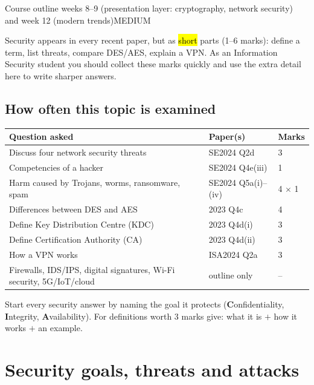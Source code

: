 \documentclass[10pt]{article}
\begin{document}
  {Course outline weeks 8--9 (presentation layer: cryptography, network security) and week 12 (modern trends)}{MEDIUM}

Security appears in every recent paper, but as \hl{short} parts (1--6 marks): define a term, list threats, compare DES/AES, explain a VPN.
As an Information Security student you should collect these marks quickly and use the extra detail here to write sharper answers.

\subsection*{How often this topic is examined}
\begin{tabularx}{\linewidth}{@{}Xll@{}}
\toprule
\textbf{Question asked} & \textbf{Paper(s)} & \textbf{Marks}\\
\midrule
Discuss four network security threats & SE2024 Q2d & 3\\
Competencies of a hacker & SE2024 Q4e(iii) & 1\\
Harm caused by Trojans, worms, ransomware, spam & SE2024 Q5a(i)--(iv) & 4 $\times$ 1\\
Differences between DES and AES & 2023 Q4c & 4\\
Define Key Distribution Centre (KDC) & 2023 Q4d(i) & 3\\
Define Certification Authority (CA) & 2023 Q4d(ii) & 3\\
How a VPN works & ISA2024 Q2a & 3\\
Firewalls, IDS/IPS, digital signatures, Wi-Fi security, 5G/IoT/cloud & outline only & --\\
\bottomrule
\end{tabularx}

\begin{examtip}
Start every security answer by naming the goal it protects (\textbf{C}onfidentiality, \textbf{I}ntegrity, \textbf{A}vailability).
For definitions worth 3 marks give: what it is $+$ how it works $+$ an example.
\end{examtip}

\section{Security goals, threats and attacks}
\end{document}
